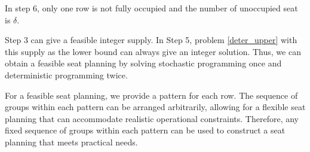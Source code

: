\begin{lem}
  In step 6, only one row is not fully occupied and the number of unoccupied seat is $\delta$.
\end{lem}


\begin{remark}
  Step 3 can give a feasible integer supply. In Step 5, problem \eqref{deter_upper} with this supply as the lower bound can always give an integer solution.  
  Thus, we can obtain a feasible seat planning by solving stochastic programming once and deterministic programming twice.
\end{remark}




\begin{remark}
For a feasible seat planning, we provide a pattern for each row. The sequence of groups within each pattern can be arranged arbitrarily, allowing for a flexible seat planning that can accommodate realistic operational constraints. Therefore, any fixed sequence of groups within each pattern can be used to construct a seat planning that meets practical needs.
\end{remark}